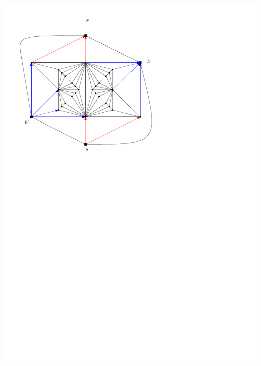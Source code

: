 \documentclass[a4paper]{article}
\begin{document}
\clearpage%
\includegraphics[width=\textwidth]{fixExtension/img/manymany1}
\clearpage%
\end{document}
